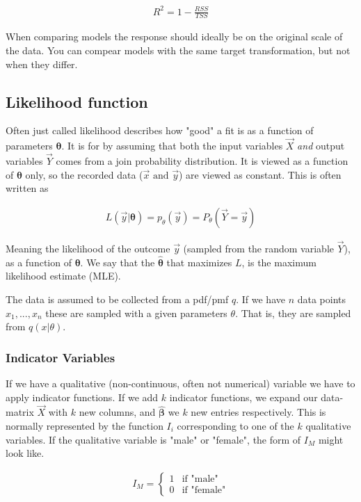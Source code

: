 \documentclass{article}
\newcommand{\vecsym}[1]{\boldsymbol{#1}} %
\newcommand{\uvec}[1]{\mathbf{\hat{#1}}}
\begin{document}
\begin{align*}
    R^2 = 1 - \frac{RSS}{TSS}
\end{align*}

When comparing models the response should ideally be on the original scale of the data. You can compear models with the same target transformation, but not when they differ.

\subsection{Likelihood function}
Often just called likelihood describes how "good" a fit is as a function of parameters $\vecsym{\theta}$. It is for by assuming that both the input variables $\Vec{X}$ \textit{and} output variables $\Vec{Y}$ comes from a join probability distribution. It is viewed as a function of $\vecsym{\theta}$ only, so the recorded data ($\Vec{x} \text{ and } \Vec{y}$) are viewed as constant. This is often written as 

\begin{align*}
    L(\Vec{y}|\vecsym{\theta}) = p_{\theta}(\Vec{y}) = P_{\theta}(\Vec{Y}=\Vec{y})
\end{align*}

Meaning the likelihood of the outcome $\Vec{y}$ (sampled from the random variable $\Vec{Y}$), as a function of $\vecsym{\theta}$. We say that the $\uvec{\theta}$ that maximizes $L$, is the maximum likelihood estimate (MLE). 

The data is assumed to be collected from a pdf/pmf $q$. If we have $n$ data points $x_1, ... , x_n$ these are sampled with a given parameters $\theta$. That is, they are sampled from $q(x|\theta)$.
 
\subsubsection{Indicator Variables}
If we have a qualitative (non-continuous, often not numerical) variable we have to apply indicator functions. If we add $k$ indicator functions, we expand our data-matrix $\Vec{X}$ with $k$ new columns, and $\uvec{\beta}$ we $k$ new entries respectively. This is normally represented by the function $I_i$ corresponding to one of the $k$ qualitative variables. If the qualitative variable is "male" or "female", the form of $I_M$ might look like. 

\begin{align*}
I_M = 
\left\{
	\begin{array}{ll}
		1  & \mbox{if } \text{"male"} \\
		0 & \mbox{if } \text{"female"}
	\end{array}
\right.
\end{align*}
\end{document}
